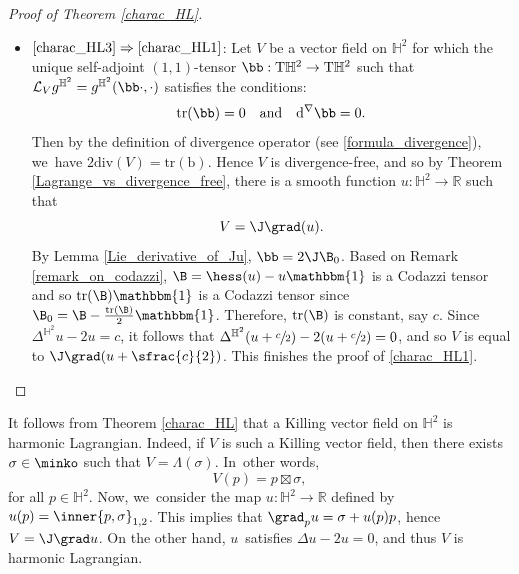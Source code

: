 \begin{proof}[Proof of Theorem \ref{charac_HL}]
\begin{itemize}
\item
$\eqref{charac_HL3}\Rightarrow\eqref{charac_HL1}$: Let \(V \) be a vector field on \(\mathbb{H}^2\) for which the unique self-adjoint \((1,1)\)-tensor \(\bb: \mathrm{T}\mathbb{H}^2 \to \mathrm{T}\mathbb{H}^2\) such that \(\mathcal{L}_V g^{\mathbb{H}^2} = g^{\mathbb{H}^2}(\bb \cdot, \cdot)\) satisfies the conditions:
\[
\mathrm{tr}(\bb) = 0 \quad \text{and} \quad \mathrm{d}^{\nabla} \bb = 0.
\]
Then by the definition of divergence operator (see \eqref{formula_divergence}), we~have $2\mathrm{div}(V)=\mathrm{tr}(\mathrm{b})$. Hence \(V \) is divergence-free, and so by Theorem \ref{Lagrange_vs_divergence_free}, there is a smooth function \hbox{\(u:\mathbb{H}^2 \to \mathbb{R} \)} such that
\[ V = \J \grad(u). \]
By Lemma \ref{Lie_derivative_of_Ju}, \(\bb = 2 \J \B_0\). Based on Remark \ref{remark_on_codazzi}, \(\B = \hess(u) - u \mathbbm{1}\) is a Codazzi tensor and so \(\mathrm{tr}(\B)\mathbbm{1}\) is a Codazzi tensor since \(\B_0 = \B - \frac{\mathrm{tr}(\B)}{2} \mathbbm{1}\). Therefore, \(\mathrm{tr}(\B)\) is constant, say \(c \). Since \(\Delta^{\mathbb{H}^2} u - 2u = c\), it follows that \(\Delta^{\mathbb{H}^2}(u + \sfrac{c}{2}) - 2(u + \sfrac{c}{2}) = 0\), and so \(V \) is equal to \(\J \grad(u + \sfrac{c}{2})\). This finishes the proof of \eqref{charac_HL1}.\qedhere
\end{itemize}
\end{proof}

\begin{remark}\label{Killing_are_harmonic}
It follows from Theorem \ref{charac_HL} that a Killing vector field on $\mathbb{H}^2$ is harmonic Lagrangian. Indeed, if $V$ is such a Killing vector field, then there exists $\sigma\in\minko$ such that $V=\Lambda(\sigma)$. In~other words,
\[
V(p)=p\boxtimes\sigma,
\]
for all $p\in\mathbb{H}^2$. Now, we~consider the map $u:\mathbb{H}^2\to\mathbb{R}$ defined by $u(p)=\inner{p,\sigma}_{1,2}$. This implies that $\grad_p u=\sigma+u(p)p$, hence $V=\J\grad u$. On the other hand, $u$~satisfies $\Delta u-2u=0$, and thus $V$ is harmonic Lagrangian.
\end{remark}

